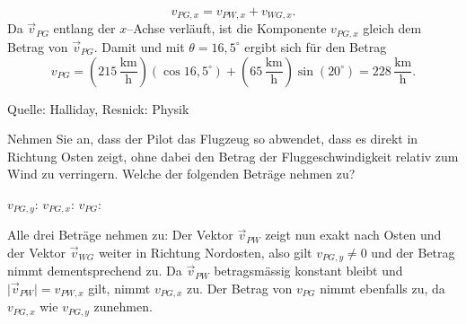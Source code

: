 \begin{MExercises}
\begin{MExercise}
\begin{MSolution}
               \begin{equation*}
               v_{PG,x}=v_{PW,x}+v_{WG,x}.
               \end{equation*} Da $\vec{v}_{PG}$ entlang der $x$--Achse verl\"auft, ist die Komponente $v_{PG,x}$ gleich dem Betrag von $\vec{v}_{PG}$. Damit und mit $\theta={{16,5}}^{\circ}$ ergibt sich f\"ur den Betrag
               \begin{equation*}
               {v}_{PG}=(215 \,\frac{\text{km}}{\text{h}})(\cos 16,5^{\circ})+(65\, \frac{\text{km}}{\text{h}})\sin(20^{\circ})=228 \,\frac{\text{km}}{\text{h}}.
               \end{equation*}
               \end{MSolution}
               
               Quelle: Halliday, Resnick: Physik
               \end{MExercise}
               
               \begin{MExercise}
               Nehmen Sie an, dass der Pilot das Flugzeug so abwendet, dass es direkt in Richtung Osten zeigt, ohne dabei den Betrag der Fluggeschwindigkeit relativ zum Wind zu verringern. Welche der folgenden Betr\"age nehmen zu?\\
               
                  \begin{MQuestionGroup}
                  $v_{PG,y}$:  
                  $v_{PG,x}$:  
                  $v_{PG  }$:  
                  \end{MQuestionGroup}
                  
                  \begin{MSolution}
                  Alle drei Betr\"age nehmen zu: Der Vektor $\vec{v}_{PW}$ zeigt nun exakt nach Osten und der Vektor $\vec{v}_{WG}$ weiter in Richtung Nordosten, also gilt $v_{PG,y}\neq 0$ und der Betrag nimmt dementsprechend zu. Da $\vec{v}_{PW}$ betragsm\"assig konstant bleibt und $\vert{\vec{v}_{PW}}\vert=v_{PW,x}$ gilt, nimmt $v_{PG,x}$ zu.
                  Der Betrag von $v_{PG}$ nimmt ebenfalls zu, da $v_{PG,x}$ wie $v_{PG,y}$ zunehmen.
               \end{MSolution}
               \end{MExercise}
               
      \end{MExercises}

